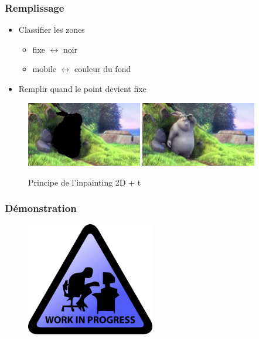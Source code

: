 \begin{frame}
  \frametitle{Remplissage}
  
  \begin{itemize}
  \item Classifier les zones
  	\begin{itemize}
  	\item fixe $\leftrightarrow$ noir
  	\item mobile $\leftrightarrow$ couleur du fond
  	\end{itemize}
  \item Remplir quand le point devient fixe  
  \end{itemize}

  \begin{figure}
  \includegraphics[width=0.45\textwidth]{Fig/bunny2-masked.png}
  \includegraphics[width=0.45\textwidth]{Fig/bunny1-original.png}
  \caption{Principe de l'inpainting 2D + t}
  \end{figure}
   
\end{frame}


 \begin{frame}
   \frametitle{Démonstration}
   \begin{figure}
   \includegraphics[width=0.5\textwidth]{Fig/workInProgress.png}
   \end{figure}

 \end{frame}